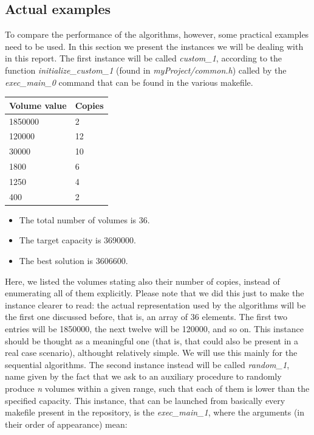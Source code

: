 \documentclass[12pt]{extarticle}
\begin{document}
\subsection{Actual examples}
To compare the performance of the algorithms, however, some practical examples need to be used. In this section we present the instances we will be dealing with in this report.\newline
The first instance will be called \label{custom-1} \emph{custom\_1}, according to the function \emph{initialize\_custom\_1} (found in \emph{myProject/common.h}) called by the \emph{exec\_main\_0} command that can be found in the various makefile.

\begin{center}
\begin{tabular}{ | m{3cm} | m{2cm}|}
 \hline
 Volume value & Copies\\
 \hline
 1850000 & 2\\
 \hline
 120000 & 12\\
 \hline
 30000 & 10\\
 \hline
 1800 & 6\\
 \hline
 1250 & 4\\
 \hline
 400 & 2\\
 \hline
\end{tabular}
\end{center}
\begin{itemize}
     \item The total number of volumes is 36.
     \item The target capacity is 3690000.
     \item The best solution is 3606600.
 \end{itemize}
Here, we listed the volumes stating also their number of copies, instead of enumerating all of them explicitly. Please note that we did this just to make the instance clearer to read: the actual representation used by the algorithms will be the first one discussed before, that is, an array of 36 elements. The first two entries will be 1850000, the next twelve will be 120000, and so on.\newline
This instance should be thought as a meaningful one (that is, that could also be present in a real case scenario), althought relatively simple. We will use this mainly for the sequential algorithms.\newline
\newline
The second instance instead will be called \label{random-1} \emph{random\_1}, name given by the fact that we ask to an auxiliary procedure to randomly produce \emph{n} volumes within a given range, such that each of them is lower than the specified capacity. This instance, that can be launched from basically every makefile present in the repository, is the \emph{exec\_main\_1}, where the arguments (in their order of appearance) mean:
\end{document}
